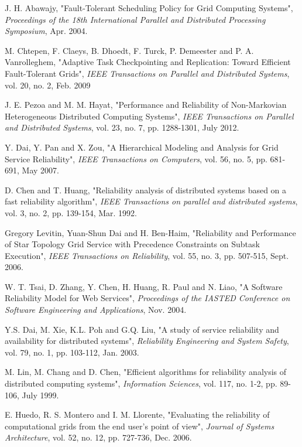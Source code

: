 \documentclass{cslthse-msc}
\begin{document}
\begin{thebibliography}{50}
	J. H. Abawajy,
	"Fault-Tolerant Scheduling Policy for Grid Computing Systems",
	\emph{Proceedings of the 18th International Parallel and Distributed Processing Symposium}, Apr. 2004.

	M. Chtepen, F. Claeys, B. Dhoedt, F. Turck, P. Demeester and P. A. Vanrolleghem,
	"Adaptive Task Checkpointing and Replication: Toward Efficient Fault-Tolerant Grids",
	\emph{IEEE Transactions on Parallel and Distributed Systems}, vol. 20, no. 2, Feb. 2009

	J. E. Pezoa and M. M. Hayat,
	"Performance and Reliability of Non-Markovian Heterogeneous Distributed Computing Systems",
	\emph{IEEE Transactions on Parallel and Distributed Systems}, vol. 23, no. 7, pp. 1288-1301, July 2012.

	Y. Dai, Y. Pan and X. Zou,
	"A Hierarchical Modeling and Analysis for Grid Service Reliability",
	\emph{IEEE Transactions on Computers}, vol. 56, no. 5, pp. 681-691, May 2007.

	D. Chen and T. Huang,
	"Reliability analysis of distributed systems based on a fast reliability algorithm",
	\emph{IEEE Transactions on parallel and distributed systems}, vol. 3, no. 2, pp. 139-154, Mar. 1992.

	Gregory Levitin, Yuan-Shun Dai and H. Ben-Haim,
	"Reliability and Performance of Star Topology Grid Service with Precedence Constraints on Subtask Execution",
	\emph{IEEE Transactions on Reliability}, vol. 55, no. 3, pp. 507-515, Sept. 2006.

	W. T. Tsai, D. Zhang, Y. Chen, H. Huang, R. Paul and N. Liao,
	"A Software Reliability Model for Web Services",
	\emph{Proceedings of the IASTED Conference on Software Engineering and Applications}, Nov. 2004. %

	Y.S. Dai, M. Xie, K.L. Poh and G.Q. Liu,
	"A study of service reliability and availability for distributed systems",
	\emph{Reliability Engineering and System Safety}, vol. 79, no. 1, pp. 103-112, Jan. 2003.

	M. Lin, M. Chang and D. Chen,
	"Efficient algorithms for reliability analysis of distributed computing systems",
	\emph{Information Sciences}, vol. 117, no. 1-2, pp. 89-106, July 1999.

	E. Huedo, R. S. Montero and I. M. Llorente,
	"Evaluating the reliability of computational grids from the end user’s point of view",
	\emph{Journal of Systems Architecture}, vol. 52, no. 12, pp. 727-736, Dec. 2006.


\end{thebibliography}
\end{document}
